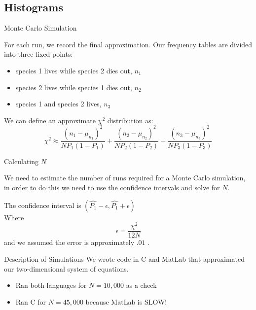 
\subsection{Histograms}

\begin{frame}{Monte Carlo Simulation}
\vfill

For each run, we record the final approximation.
\vfill
Our frequency tables are divided into three fixed points: 

\begin{itemize}
	\item species 1 lives while species 2 dies out, $n_1$
	\item species 2 lives while species 1 dies out, $n_2$
	\item species 1 and species 2 lives, $n_3$
\end{itemize}
\vfill

We can define an approximate $\chi^2$ distribution as:
$$ \chi^2 \approx \frac{\left(n_1 - \mu_{n_1}\right)^2}{N P_1 (1 - P_1)} + 
                  \frac{\left(n_2 - \mu_{n_2}\right)^2}{N P_2 (1 - P_2)} +
									\frac{\left(n_3 - \mu_{n_3}\right)^2}{N P_3 (1 - P_3)}$$
\vfill
\end{frame}

 
\begin{frame}{Calculating $N$}
	
	\vfill
	
	We need to estimate the number of runs required for a Monte Carlo simulation, in order to do this we need to use the confidence intervals and solve for $N$. 
	
	\vfill
	
	The confidence interval is $\left(\hat{P_1} - \epsilon , \hat{P_1} + \epsilon \right)$ \\
	Where $$\epsilon =\frac{\chi^2}{12N}$$ and we assumed the error is approximately $.01$ .
		
	\vfill
		
\end{frame}

\begin{frame}{Description of Simulations}
We wrote code in C and MatLab that approximated our two-dimensional system of equations. 
	\begin{itemize}
		\item Ran both languages for $N = 10,000$ as a check
		\item Ran C for $N =45,000$ because MatLab is SLOW!
	\end{itemize}
\end{frame}


